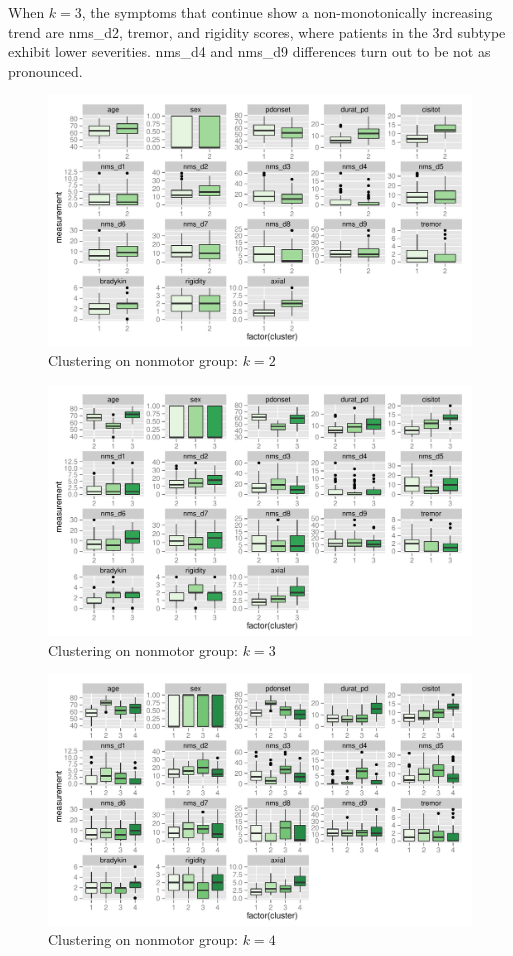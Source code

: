 \documentclass[10pt]{article}
\begin{document}
When $k = 3$, the symptoms that continue show a non-monotonically increasing
trend are nms\_d2, tremor, and rigidity scores, where patients in the 3rd
subtype exhibit lower severities. nms\_d4 and nms\_d9 differences turn out to be
not as pronounced.

\begin{figure}[h]
  \centering
  \includegraphics[width=\linewidth]{c2-summaries-2.pdf}
  \caption{Clustering on nonmotor group: $k = 2$}
  \label{fig:c2-summaries-2}
\end{figure}
\begin{figure}[h]
  \centering
  \includegraphics[width=\linewidth]{c2-summaries-3.pdf}
  \caption{Clustering on nonmotor group: $k = 3$}
  \label{fig:c2-summaries-3}
\end{figure}
\begin{figure}[h]
  \centering
  \includegraphics[width=\linewidth]{c2-summaries-4.pdf}
  \caption{Clustering on nonmotor group: $k = 4$}
  \label{fig:c2-summaries-4}
\end{figure}
\end{document}
